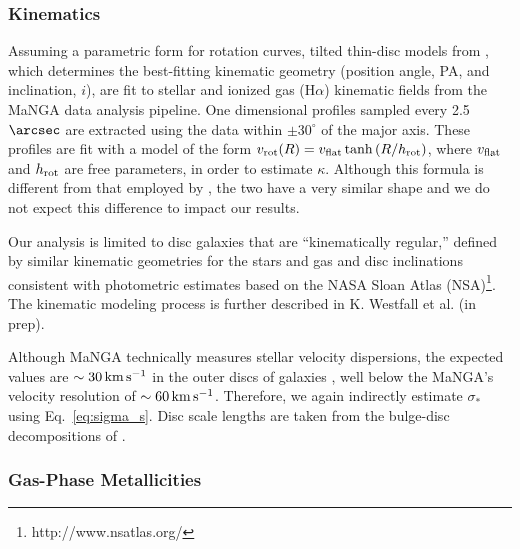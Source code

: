 \documentclass[fleqn,usenatbib]{mnras}
\begin{document}
\subsubsection{Kinematics}
\label{sec:kinematics}


Assuming a parametric form for rotation curves, tilted thin-disc models from \citet{Andersen13}, which determines the best-fitting kinematic geometry
(position angle, PA, and inclination, $i$), are fit to stellar and ionized gas (H$\alpha$) kinematic fields from the MaNGA data
analysis pipeline.  One dimensional profiles sampled every 2.5$\arcsec$ are extracted using the data within
$\pm30^{\circ}$ of the major axis. These profiles are fit with a model of the form $v_{\rm rot}(R)=v_{\rm
  flat}\tanh{\left(R/h_{\rm rot}\right)}$, where $v_{\rm flat}$ and $h_{\rm rot}$ are free parameters, in order to estimate
$\kappa$. Although this formula is different from that employed by \citet{Leroy08}, the two have a very similar shape and we do not expect this difference to impact our results.

Our analysis is limited to disc galaxies that are ``kinematically regular,'' defined by similar kinematic geometries for the
stars and gas and disc inclinations consistent with photometric estimates based on the NASA Sloan Atlas
(NSA)\footnote{http://www.nsatlas.org/}.  The kinematic modeling process is further described in K. Westfall et al. (in prep). 

Although MaNGA technically measures stellar velocity dispersions, the expected values are $\sim30\,{\rm km\,s^{-1}}$ in the outer discs of galaxies  \citep[e.g.][]{Bottema93,Shapiro03,Martinsson13}, well below the MaNGA's velocity resolution of $\sim60\,{\rm km\,s^{-1}}$.  Therefore, we again indirectly estimate $\sigma_*$ using Eq.~\ref{eq:sigma_s}. Disc scale lengths are taken from the bulge-disc decompositions of \citet{Simard11}.  




\subsubsection{Gas-Phase Metallicities}
\label{sec:manga_metal}
\end{document}
